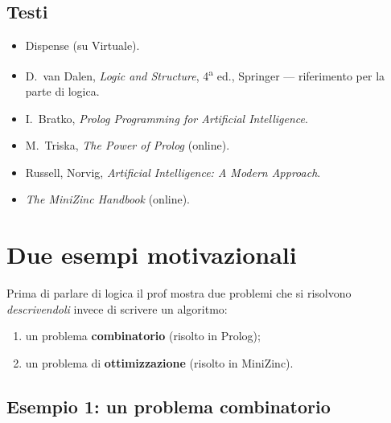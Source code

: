 \subsection{Testi}
\begin{itemize}
  \item Dispense (su Virtuale).
  \item D.~van Dalen, \emph{Logic and Structure}, 4\textsuperscript{a} ed.,
        Springer --- riferimento per la parte di logica.
  \item I.~Bratko, \emph{Prolog Programming for Artificial Intelligence}.
  \item M.~Triska, \emph{The Power of Prolog} (online).
  \item Russell, Norvig, \emph{Artificial Intelligence: A Modern Approach}.
  \item \emph{The MiniZinc Handbook} (online).
\end{itemize}

\section{Due esempi motivazionali}

Prima di parlare di logica il prof mostra due problemi che si risolvono
\emph{descrivendoli} invece di scrivere un algoritmo:
\begin{enumerate}
  \item un problema \textbf{combinatorio} (risolto in Prolog);
  \item un problema di \textbf{ottimizzazione} (risolto in MiniZinc).
\end{enumerate}

\subsection{Esempio 1: un problema combinatorio}



